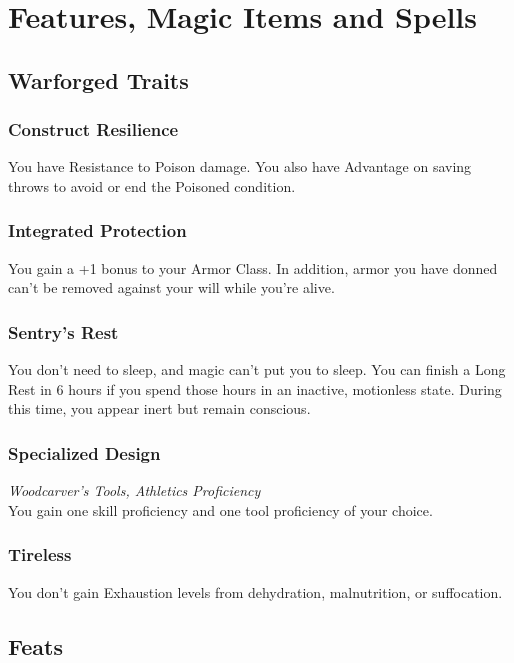 \documentclass[letterpaper,openany,oneside,twocolumn]{book}
\begin{document}
\onecolumn


\rendercharactersheet

\renderbackgroundsheet

\renderspellsheet


\restoregeometry
\twocolumn

\chapter*{Features, Magic Items and Spells}

\section*{Warforged Traits}
\subsection*{Construct Resilience}
You have Resistance to Poison damage. You also have Advantage on saving throws to avoid or end the Poisoned condition.
\subsection*{Integrated Protection}
You gain a +1 bonus to your Armor Class. In addition, armor you have donned can't be removed against your will while you're alive.
\subsection*{Sentry's Rest}
You don't need to sleep, and magic can't put you to sleep. You can finish a Long Rest in 6 hours if you spend those hours in an inactive, motionless state. During this time, you appear inert but remain conscious.
\subsection*{Specialized Design}
\textit{Woodcarver's Tools, Athletics Proficiency}\\
You gain one skill proficiency and one tool proficiency of your choice.
\subsection*{Tireless}
You don't gain Exhaustion levels from dehydration, malnutrition, or suffocation.

\section*{Feats}
\end{document}
